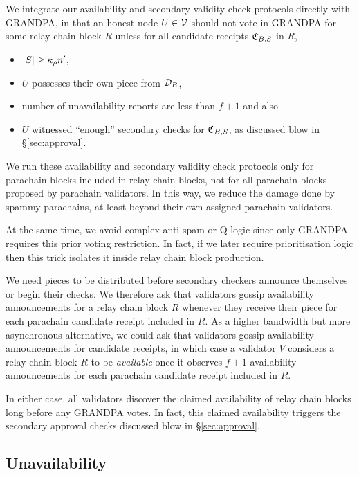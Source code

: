 We integrate our availability and secondary validity check protocols directly with GRANDPA, in that an honest node $U \in \mathcal{V}$ should not vote in GRANDPA for some relay chain block $R$ unless for all candidate receipts $\mathfrak{C}_{B,S}$ in $R$,
\begin{itemize}
\item $|S| \geq \kappa_{\rho} n'$,
\item $U$ possesses their own piece from $\mathcal{D}_B$,
\item number of unavailability reports are less than  $f+1$ and also
\item $U$ witnessed ``enough'' secondary checks for $\mathfrak{C}_{B,S}$,
 as discussed blow in \S\ref{sec:approval}.
\end{itemize}

We run these availability and secondary validity check protocols only for parachain blocks included in relay chain blocks, not for all parachain blocks proposed by parachain validators.  In this way, we reduce the damage done by spammy parachains, at least beyond their own assigned parachain validators.

At the same time, we avoid complex anti-spam or Q logic since only GRANDPA requires this prior voting restriction.  In fact, if we later require prioritisation logic then this trick isolates it inside relay chain block production.

We need pieces to be distributed before secondary checkers announce themselves or begin their checks.  We therefore ask that validators gossip availability announcements for a relay chain block $R$ whenever they receive their piece for each parachain candidate receipt included in $R$.  As a higher bandwidth but more asynchronous alternative, we could ask that validators gossip availability announcements for candidate receipts, in which case a validator $V$ considers a relay chain block $R$ to be {\em available} once it observes $f+1$ availability announcements for each parachain candidate receipt included in $R$.

In either case, all validators discover the claimed availability of relay chain blocks long before any GRANDPA votes.  In fact, this claimed availability triggers the secondary approval checks discussed blow in \S\ref{sec:approval}.  


\subsection{Unavailability} %
\label{sec:unavailability}

